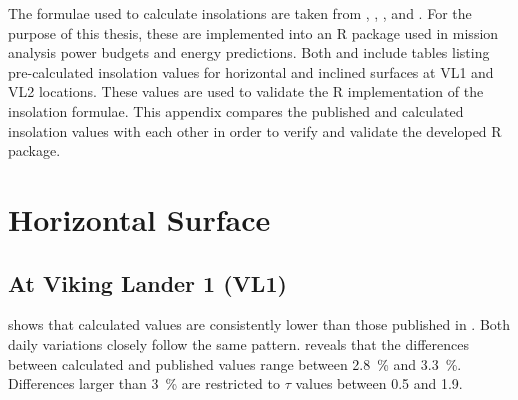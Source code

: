 The formulae used to calculate insolations are taken from , , , and . For the purpose of this thesis, these are implemented into an R package used in mission analysis power budgets and energy predictions. Both  and  include tables listing pre-calculated insolation values for horizontal and inclined surfaces at \ac{VL1} and \ac{VL2} locations. These values are used to validate the R implementation of the insolation formulae. This appendix compares the published and calculated insolation values with each other in order to verify and validate the developed R package.


\section{Horizontal Surface}
\subsection{At Viking Lander 1 (VL1)}
 shows that calculated values are consistently lower than those published in . Both daily variations closely follow the same pattern.  reveals that the differences between calculated and published values range between \SI{2.8}{\percent} and \SI{3.3}{\percent}. Differences larger than \SI{3}{\percent} are restricted to $\tau$ values between 0.5 and 1.9.

